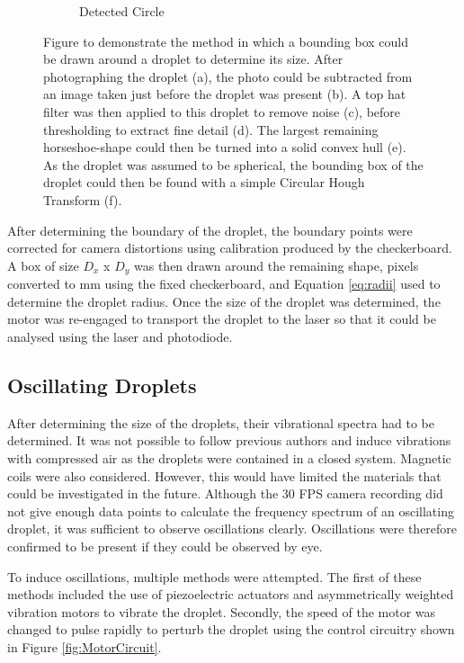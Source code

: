 \documentclass{physics_article_B}
\begin{document}
\begin{figure}[H]
\begin{subfigure}[b]{0.3\textwidth}
                        \caption{Detected Circle}
                        \label{fig:size:6}
                    \end{subfigure}
                    \caption{Figure to demonstrate the method in which a bounding box could be drawn around a droplet to determine its size. After photographing the droplet (a), the photo could be subtracted from an image taken just before the droplet was present (b). A top hat filter was then applied to this droplet to remove noise (c), before thresholding to extract fine detail (d). The largest remaining horseshoe-shape could then be turned into a solid convex hull (e). As the droplet was assumed to be spherical, the bounding box of the droplet could then be found with a simple Circular Hough Transform (f).}\label{fig:size}
                \end{figure}
            
            After determining the boundary of the droplet, the boundary points were corrected for camera distortions using calibration produced by the checkerboard. A box of size $D_x$ x $D_y$ was then drawn around the remaining shape, pixels converted to mm using the fixed checkerboard, and Equation \ref{eq:radii} used to determine the droplet radius. Once the size of the droplet was determined, the motor was re-engaged to transport the droplet to the laser so that it could be analysed using the laser and photodiode.
    
    \subsection{Oscillating Droplets\label{sect:method:oscillating}}
        
        After determining the size of the droplets, their vibrational spectra had to be determined. It was not possible to follow previous authors and induce vibrations with compressed air\cite{Temperton2012,Sharp2011} as the droplets were contained in a closed system. Magnetic coils were also considered. However, this would have limited the materials that could be investigated in the future. Although the 30 FPS camera recording did not give enough data points to calculate the frequency spectrum of an oscillating droplet, it was sufficient to observe oscillations clearly. Oscillations were therefore confirmed to be present if they could be observed by eye.
        
        To induce oscillations, multiple methods were attempted. The first of these methods included the use of piezoelectric actuators and asymmetrically weighted vibration motors to vibrate the droplet. Secondly, the speed of the motor was changed to pulse rapidly to perturb the droplet using the control circuitry shown in Figure \ref{fig:MotorCircuit}. 
        
\end{document}
